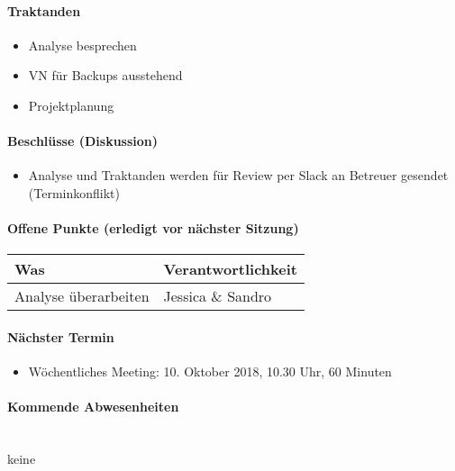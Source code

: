 \paragraph{Traktanden}
\begin{itemize}	
	\item Analyse besprechen
	\item VN für Backups ausstehend
	\item Projektplanung
\end{itemize}

\paragraph{Beschlüsse (Diskussion)}
\begin{itemize}	
	\item Analyse und Traktanden werden für Review per Slack an Betreuer gesendet (Terminkonflikt)
\end{itemize}

\paragraph{Offene Punkte (erledigt vor nächster Sitzung)} \mbox{}
\begin{table}[H]
	\centering
	\begin{tabularx}{\textwidth}{X | p{4.5cm}}
		\rowcolor{gray!50}
		\textbf{Was} & \textbf{Verantwortlichkeit} \\
		\hline	
		Analyse überarbeiten & Jessica \& Sandro  \\
	\end{tabularx}
	\label{tab:my-label}
\end{table}

\paragraph{Nächster Termin}
\begin{itemize}	
	\item Wöchentliches Meeting: 10. Oktober 2018, 10.30 Uhr, 60 Minuten
\end{itemize}

\paragraph{Kommende Abwesenheiten} \mbox{}\\
keine

\newpage






